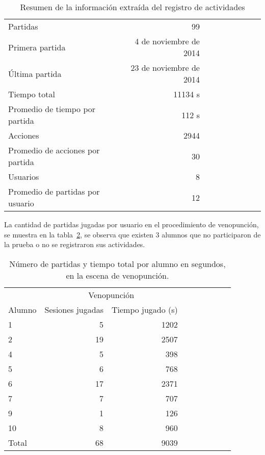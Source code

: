 \begin{table}[H]
\centering
\begin{tabular}{lrrrrrrrr}
\toprule
Partidas                         & 99 \\
Primera partida					 & 4 de noviembre de 2014 \\
Última partida					 & 23 de noviembre de 2014 \\
\midrule
Tiempo total                     & 11134 s \\
Promedio de tiempo por partida   & 112 s \\
\midrule
Acciones                         & 2944 \\
Promedio de acciones por partida & 30 \\
\midrule
Usuarios                         & 8 \\
Promedio de partidas por usuario & 12 \\
\bottomrule
\end{tabular}
\caption{Resumen de la información extraída del registro de actividades}
\label{tab:log_total}
\end{table}

La cantidad de partidas jugadas por usuario en el procedimiento de venopunción,
se muestra en la tabla~\ref{tab:log_hemocultivo_partida}, se observa que existen
$3$ alumnos que no participaron de la prueba o no se registraron sus
actividades.

\begin{table}[H]
\centering
\begin{tabular}{lrrrrrrrr}
\toprule
& \multicolumn{2}{c}{Venopunción} \\
\cmidrule(lr){2-3} 
Alumno   & Sesiones jugadas & Tiempo jugado (s) \\
\midrule
 1       & 5                & 1202 \\
 2       & 19               & 2507 \\
 4       & 5                & 398  \\
 5       & 6                & 768  \\
 6       & 17               & 2371 \\
 7       & 7                & 707  \\
 9       & 1                & 126  \\
10       & 8                & 960  \\
\midrule
Total   & 68               & 9039 \\
\bottomrule
\end{tabular}
\caption{Número de partidas y tiempo total por alumno en segundos, en la escena
    de venopunción.}
\label{tab:log_hemocultivo_partida}
\end{table}



